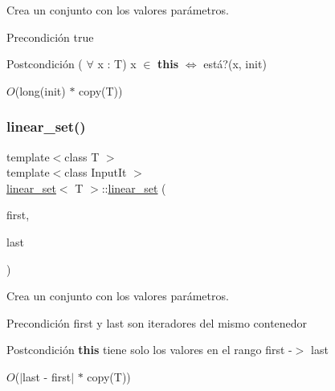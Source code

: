 Crea un conjunto con los valores parámetros. 

\begin{DoxyPrecond}{Precondición}
true 
\end{DoxyPrecond}
\begin{DoxyPostcond}{Postcondición}
( $\forall$ x \+: T) x $\in$ {\bfseries this} $\Leftrightarrow$ está?(x, init)
\end{DoxyPostcond}

\begin{DoxyDescription}
\item[Complejidad Temporal]$O$(long(init) $\ast$ copy(\+T))
\end{DoxyDescription}\mbox{\label{classlinear__set_ac1949a93e1927b46604fbdcecb8a1ae3}} 
\subsubsection{\texorpdfstring{linear\+\_\+set()}{linear\_set()}\hspace{0.1cm}{\footnotesize\ttfamily [3/4]}}
{\footnotesize\ttfamily template$<$class T $>$ \\
template$<$class Input\+It $>$ \\
\mbox{\hyperlink{classlinear__set}{linear\+\_\+set}}$<$ T $>$\+::\mbox{\hyperlink{classlinear__set}{linear\+\_\+set}} (\begin{DoxyParamCaption}\item[{Input\+It}]{first,  }\item[{Input\+It}]{last }\end{DoxyParamCaption})}



Crea un conjunto con los valores parámetros. 

\begin{DoxyPrecond}{Precondición}
first y last son iteradores del mismo contenedor 
\end{DoxyPrecond}
\begin{DoxyPostcond}{Postcondición}
{\bfseries this} tiene solo los valores en el rango first -\/$>$ last
\end{DoxyPostcond}

\begin{DoxyDescription}
\item[Complejidad Temporal]$O$($\vert$last -\/ first$\vert$ $\ast$ copy(\+T))
\end{DoxyDescription}\mbox{\label{classlinear__set_a45f6e9a11657e0945e88300da619af22}} 
